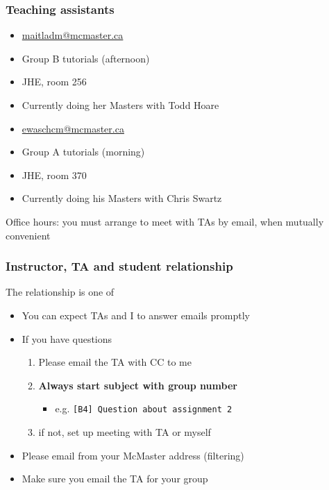 \begin{frame}\frametitle{Teaching assistants}
	{\color{myGreen}{Danielle Maitland}}
	\begin{itemize}
		\item	\url{maitladm@mcmaster.ca}
		\item	Group B tutorials (afternoon)
		\item	JHE, room 256
		\item	Currently doing her Masters with Todd Hoare
	\end{itemize}
	\vspace{12pt}
	{\color{myGreen}{Chris Ewaschuk}}
	\begin{itemize}
		\item	\url{ewaschcm@mcmaster.ca}
		\item	Group A tutorials (morning)
		\item	JHE, room 370
		\item	Currently doing his Masters with Chris Swartz
	\end{itemize}
	\vspace{12pt}
	Office hours: you must arrange to meet with TAs by email, when mutually convenient
\end{frame}

\begin{frame}\frametitle{Instructor, TA and student relationship}
	\begin{exampleblock}{}
		The relationship is one of {}
	\end{exampleblock}

	\begin{itemize}
		\item	You can expect TAs and I to answer emails promptly

		\vspace{12pt}
		\item	If you have questions
			\begin{enumerate}
				\item	Please email the TA with CC to me \hfill {\tiny{\color{myOrange}{$\longleftarrow$ hopefully this solves your problem}}}
				\item	\textbf{Always start subject with group number}
				\begin{itemize}
					\item	e.g. \texttt{[B4] Question about assignment 2}
				\end{itemize}
				\item	if not, set up meeting with TA or myself
			\end{enumerate}
		\item	Please email from your McMaster address (filtering)
		\item	Make sure you email the TA for your group
	\end{itemize}
\end{frame}

